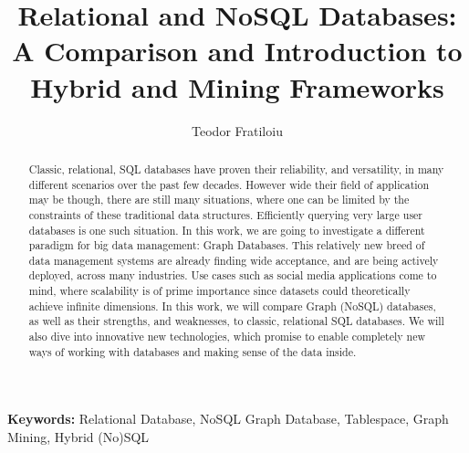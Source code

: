 \documentclass[10pt,        %
               a4paper,     %
               journal,     %
               ]{IEEEtran}
\makeatletter
\def\markboth#1#2{\def\leftmark{\@IEEEcompsoconly{\sffamily}\MakeUppercase{\protect#1}}%
\def\rightmark{\@IEEEcompsoconly{\sffamily}\MakeUppercase{\protect#2}}}
\makeatother
\begin{document}
\title{Relational and NoSQL Databases: A Comparison and Introduction to Hybrid and Mining Frameworks}

\author{Teodor Fratiloiu}%

\markboth{Scientific Seminar on Security in Information Technology, Winter Semester 2020/2021}%
{Teodor Fratiloiu: Comparison of SQL Relational Databases and NoSQL Graph Databases}

\maketitle


\begin{abstract}
Classic, relational, SQL databases have proven their reliability, and versatility, in many different scenarios over the past few decades. However wide their field of application may be though, there are still many situations, where one can be limited by the constraints of these traditional data structures. Efficiently querying very large user databases is one such situation. In this work, we are going to investigate a different paradigm for  big data management: Graph Databases. This relatively new breed of data management systems are already finding wide acceptance, and are being actively deployed, across many industries. Use cases such as social media applications come to mind, where scalability is of prime importance since datasets could theoretically achieve infinite dimensions. In this work, we will compare Graph (NoSQL) databases, as well as their strengths, and weaknesses, to classic, relational SQL databases. We will also dive into innovative new technologies, which promise to enable completely new ways of working with databases and making sense of the data inside.
\end{abstract}

\textbf{Keywords:} Relational Database, NoSQL Graph Database, Tablespace, Graph Mining, Hybrid (No)SQL 
\end{document}
